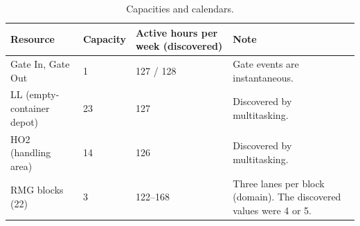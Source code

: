 \begin{table}[htbp]
\centering
\small
\begin{tabularx}{\textwidth}{L{3.6cm}L{1.6cm}L{2.6cm}Y}
\toprule
\textbf{Resource} & \textbf{Capacity} & \textbf{Active hours per week (discovered)} & \textbf{Note} \\
\midrule
Gate In, Gate Out & 1 & 127 / 128 & Gate events are instantaneous. \\
LL (empty-container depot) & 23 & 127 & Discovered by multitasking. \\
HO2 (handling area) & 14 & 126 & Discovered by multitasking. \\
RMG blocks (22) & 3 & 122--168 & Three lanes per block (domain). The discovered values were 4 or 5. \\
\bottomrule
\end{tabularx}
\par{}
\caption{Capacities and calendars.}
\label{tab:sim_capacities}
\end{table}
